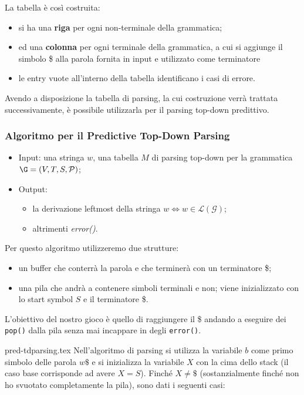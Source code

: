 \documentclass[class=book, crop=false, oneside, 12pt]{standalone}
\begin{document}
La tabella è così costruita:
\begin{itemize}
    \item si ha una \textbf{riga} per ogni non-terminale della grammatica;
    \item ed una \textbf{colonna} per ogni terminale della grammatica, a cui si aggiunge il simbolo \$ alla parola fornita in input e utilizzato come terminatore
    \item le entry vuote all'interno della tabella identificano i casi di errore.
\end{itemize}

Avendo a disposizione la tabella di parsing, la cui costruzione verrà trattata successivamente, è possibile utilizzarla per il parsing top-down predittivo.

\subsubsection{Algoritmo per il Predictive Top-Down Parsing}
\begin{itemize}
    \item Input: una stringa \(w\), una tabella \(M\) di parsing top-down per la grammatica \(\G = (V, T, S, \mathcal{P})\);
    \item Output: 
    \begin{itemize}
        \item la derivazione leftmost della stringa \(w \iff w \in \mathcal{L(G)}\);
        \item altrimenti \emph{error()}.
    \end{itemize}
\end{itemize}
Per questo algoritmo utilizzeremo due strutture:
\begin{itemize}
    \item un buffer che conterrà la parola e che terminerà con un terminatore \$;
    \item una pila che andrà a contenere simboli terminali e non; viene inizializzato con lo start symbol \(S\) e il terminatore \$.
\end{itemize}
L'obiettivo del nostro gioco è quello di raggiungere il \$ andando a eseguire dei \texttt{pop()} dalla pila senza mai incappare in degli \texttt{error()}.

{pred-tdparsing.tex}
Nell'algoritmo di parsing si utilizza la variabile \(b\) come primo simbolo delle parola \(w\$\) e si inizializza la variabile \(X\) con la cima dello stack (il caso base corrisponde ad avere \(X = S\)). Finché \(X \neq \$\) (sostanzialmente finché non ho svuotato completamente la pila), sono dati i seguenti casi:
\end{document}
